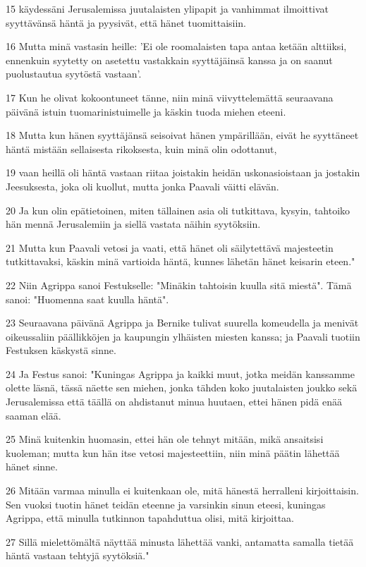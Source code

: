 \par 15 käydessäni Jerusalemissa juutalaisten ylipapit ja vanhimmat ilmoittivat syyttävänsä häntä ja pyysivät, että hänet tuomittaisiin.
\par 16 Mutta minä vastasin heille: 'Ei ole roomalaisten tapa antaa ketään alttiiksi, ennenkuin syytetty on asetettu vastakkain syyttäjäinsä kanssa ja on saanut puolustautua syytöstä vastaan'.
\par 17 Kun he olivat kokoontuneet tänne, niin minä viivyttelemättä seuraavana päivänä istuin tuomarinistuimelle ja käskin tuoda miehen eteeni.
\par 18 Mutta kun hänen syyttäjänsä seisoivat hänen ympärillään, eivät he syyttäneet häntä mistään sellaisesta rikoksesta, kuin minä olin odottanut,
\par 19 vaan heillä oli häntä vastaan riitaa joistakin heidän uskonasioistaan ja jostakin Jeesuksesta, joka oli kuollut, mutta jonka Paavali väitti elävän.
\par 20 Ja kun olin epätietoinen, miten tällainen asia oli tutkittava, kysyin, tahtoiko hän mennä Jerusalemiin ja siellä vastata näihin syytöksiin.
\par 21 Mutta kun Paavali vetosi ja vaati, että hänet oli säilytettävä majesteetin tutkittavaksi, käskin minä vartioida häntä, kunnes lähetän hänet keisarin eteen."
\par 22 Niin Agrippa sanoi Festukselle: "Minäkin tahtoisin kuulla sitä miestä". Tämä sanoi: "Huomenna saat kuulla häntä".
\par 23 Seuraavana päivänä Agrippa ja Bernike tulivat suurella komeudella ja menivät oikeussaliin päällikköjen ja kaupungin ylhäisten miesten kanssa; ja Paavali tuotiin Festuksen käskystä sinne.
\par 24 Ja Festus sanoi: "Kuningas Agrippa ja kaikki muut, jotka meidän kanssamme olette läsnä, tässä näette sen miehen, jonka tähden koko juutalaisten joukko sekä Jerusalemissa että täällä on ahdistanut minua huutaen, ettei hänen pidä enää saaman elää.
\par 25 Minä kuitenkin huomasin, ettei hän ole tehnyt mitään, mikä ansaitsisi kuoleman; mutta kun hän itse vetosi majesteettiin, niin minä päätin lähettää hänet sinne.
\par 26 Mitään varmaa minulla ei kuitenkaan ole, mitä hänestä herralleni kirjoittaisin. Sen vuoksi tuotin hänet teidän eteenne ja varsinkin sinun eteesi, kuningas Agrippa, että minulla tutkinnon tapahduttua olisi, mitä kirjoittaa.
\par 27 Sillä mielettömältä näyttää minusta lähettää vanki, antamatta samalla tietää häntä vastaan tehtyjä syytöksiä."

